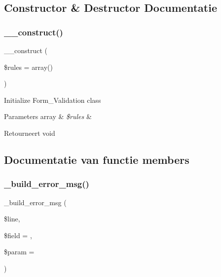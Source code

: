 \subsection{Constructor \& Destructor Documentatie}
\mbox{\label{class_c_i___form__validation_ac7224a1f92da249b312d1400c459ba83}} 
\subsubsection{\texorpdfstring{\_\_construct()}{\_\_construct()}}
{\footnotesize\ttfamily \+\_\+\+\_\+construct (\begin{DoxyParamCaption}\item[{}]{\$rules = {\ttfamily array()} }\end{DoxyParamCaption})}

Initialize Form\+\_\+\+Validation class


\begin{DoxyParams}[1]{Parameters}
array & {\em \$rules} & \\
\hline
\end{DoxyParams}
\begin{DoxyReturn}{Retourneert}
void 
\end{DoxyReturn}


\subsection{Documentatie van functie members}
\mbox{\label{class_c_i___form__validation_a970cb9f78d6cefc93e795d4d72e085af}} 
\subsubsection{\texorpdfstring{\_build\_error\_msg()}{\_build\_error\_msg()}}
{\footnotesize\ttfamily \+\_\+build\+\_\+error\+\_\+msg (\begin{DoxyParamCaption}\item[{}]{\$line,  }\item[{}]{\$field = {\ttfamily \textquotesingle{}\textquotesingle{}},  }\item[{}]{\$param = {\ttfamily \textquotesingle{}\textquotesingle{}} }\end{DoxyParamCaption})\hspace{0.3cm}{\ttfamily [protected]}}

